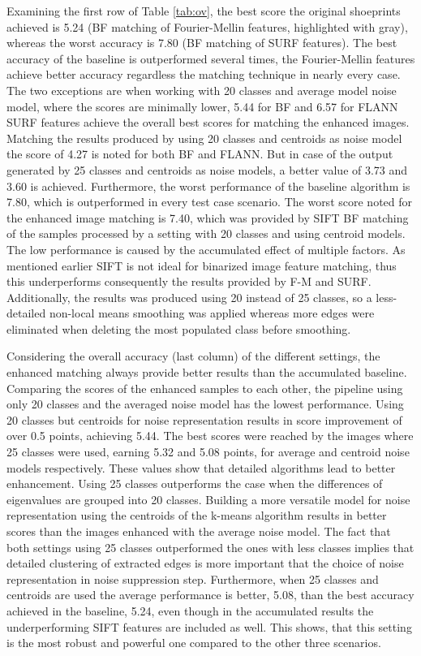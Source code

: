 \documentclass[draft,final]{vutinfth} %
\begin{document}
\par
Examining the first row of Table \ref{tab:ov}, the best score the original shoeprints achieved is 5.24 (BF matching of Fourier-Mellin features, highlighted with gray), whereas the worst accuracy is 7.80 (BF matching of SURF features).
The best accuracy of the baseline is outperformed several times, the Fourier-Mellin features achieve better accuracy regardless the matching technique in nearly every case.
The two exceptions are when working with 20 classes and average model noise model, where the scores are minimally lower, 5.44 for BF and 6.57 for FLANN
SURF features achieve the overall best scores for matching the enhanced images.
Matching the results produced by using 20 classes and centroids as noise model the score of 4.27 is noted for both BF and FLANN.
But in case of the output generated by 25 classes and centroids as noise models, a better value of 3.73 and 3.60 is achieved.
Furthermore, the worst performance of the baseline algorithm is 7.80, which is outperformed in every test case scenario.
The worst score noted for the enhanced image matching is 7.40, which was provided by SIFT BF matching of the samples processed by a setting with 20 classes and using centroid models.
The low performance is caused by the accumulated effect of multiple factors.
As mentioned earlier SIFT is not ideal for binarized image feature matching, thus this underperforms consequently the results provided by F-M and SURF.
Additionally, the results was produced using 20 instead of 25 classes, so a less-detailed non-local means smoothing was applied whereas more edges were eliminated when deleting the most populated class before smoothing.

\par
Considering the overall accuracy (last column) of the different settings, the enhanced matching always provide better results than the accumulated baseline.
Comparing the scores of the enhanced samples to each other, the pipeline using only 20 classes and the averaged noise model has the lowest performance.
Using 20 classes but centroids for noise representation results in score improvement of over 0.5 points, achieving 5.44.
The best scores were reached by the images where 25 classes were used, earning 5.32 and 5.08 points, for average and centroid noise models respectively.
These values show that detailed algorithms lead to better enhancement.
Using 25 classes outperforms the case when the differences of eigenvalues are grouped into 20 classes.
Building a more versatile model for noise representation using the centroids of the k-means algorithm results in better scores than the images enhanced with the average noise model.
The fact that both settings using 25 classes outperformed the ones with less classes implies that detailed clustering of extracted edges is more important that the  choice of noise representation in noise suppression step.
Furthermore, when 25 classes and centroids are used the average performance is better, 5.08, than the best accuracy achieved in the baseline, 5.24, even though in the accumulated results the underperforming SIFT features are included as well.
This shows, that this setting is the most robust and powerful one compared to the other three scenarios.
\end{document}
